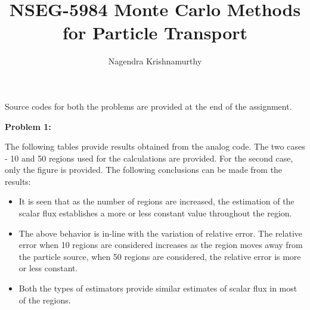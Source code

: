 \documentclass[12pt]{article}
\title{NSEG-5984 Monte Carlo Methods for Particle Transport}
\author{Nagendra Krishnamurthy}
\begin{document}
Source codes for both the problems are provided at the end of the
assignment.

\textbf{Problem 1:}

The following tables provide results obtained from the analog code.
The two cases - 10 and 50 regions used for the calculations are
provided. For the second case, only the figure is provided. The
following conclusions can be made from the results:
\begin{itemize}
  \item It is seen that as the number of regions are increased, the
    estimation of the scalar flux establishes a more or less constant
    value throughout the region.
  \item The above behavior is in-line with the variation of relative
    error. The relative error when 10 regions are considered increases
    as the region moves away from the particle source, when 50 regions
    are considered, the relative error is more or less constant.
  \item Both the types of estimators provide similar estimates of
    scalar flux in most of the regions.
\end{itemize}
\end{document}
